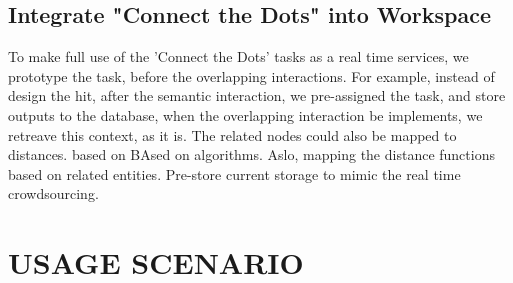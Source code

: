 \documentclass[journal]{vgtc}                %
\begin{document}
\subsection{Integrate "Connect the Dots" into Workspace}
To make full use of the 'Connect the Dots' tasks as a real time services, we prototype the task, before the overlapping interactions.
For example, instead of design the hit, after the semantic interaction, we pre-assigned the task, and store outputs to the database, when the overlapping interaction be implements, we retreave this context, as it is.
The related nodes could also be mapped to distances. based on
BAsed on algorithms. Aslo, mapping the distance functions based on related entities.
Pre-store current storage to mimic the real time crowdsourcing.


\section{USAGE SCENARIO}
\end{document}
